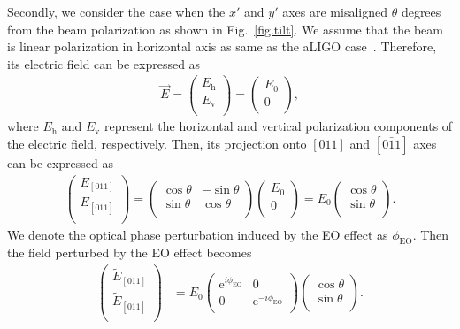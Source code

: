 Secondly, we consider the case when the $x'$ and $y'$ axes are misaligned $\theta$ degrees from the beam polarization as shown in Fig.~\ref{fig.tilt}.
We assume that the beam is linear polarization in horizontal axis as same as the aLIGO case~\cite{aasi:2015}.
Therefore, its electric field can be expressed as
\begin{align}
    \vec{E} = \begin{pmatrix}
    E_{\mathrm{h}} \\ E_{\mathrm{v}} \\
    \end{pmatrix}
     = \begin{pmatrix}
    E_0 \\ 0 \\
    \end{pmatrix},
\end{align}
where $E_{\mathrm{h}}$ and $E_{\mathrm{v}}$ represent the horizontal and vertical polarization components of the electric field, respectively.
Then, its projection onto $[011]$ and $[0\bar{1}1]$ axes can be expressed as
\begin{align}
    \begin{pmatrix}
    E_{[011]} \\ E_{[0\bar{1}1]} \\
    \end{pmatrix}
    =
    \begin{pmatrix}
    \cos\theta & -\sin\theta  \\ \sin\theta & \cos\theta \\
    \end{pmatrix}
    \begin{pmatrix}
    E_0 \\ 0 \\
    \end{pmatrix}
    =
    E_0
    \begin{pmatrix}
    \cos\theta \\ \sin\theta \\
    \end{pmatrix}.
\end{align}
We denote the optical phase perturbation induced by the EO effect as $\phi_{\mathrm{EO}}$.
Then the field perturbed by the EO effect becomes
\begin{align}
    \begin{pmatrix}
    \tilde{E}_{[011]} \\ \tilde{E}_{[0\bar{1}1]} \\
    \end{pmatrix}
    &=
    E_0
    \begin{pmatrix}
    \mathrm{e}^{i\phi_{\mathrm{EO}}} & 0 \\ 0 & \mathrm{e}^{-i\phi_{\mathrm{EO}}} \\
    \end{pmatrix}
    \begin{pmatrix}
    \cos\theta \\ \sin\theta \\
    \end{pmatrix}.
\end{align}
